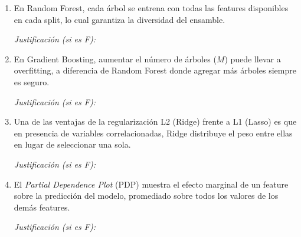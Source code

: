 \documentclass[11pt,a4paper]{article}
\begin{document}
\begin{enumerate}[label=\textbf{\arabic*.}, leftmargin=*, itemsep=18pt]

\item \underline{\hspace{1cm}} En Random Forest, cada \'arbol se entrena con todas las features disponibles en cada split, lo cual garantiza la diversidad del ensamble.

\vspace{0.5cm}
\noindent\textit{Justificaci\'on (si es F):} \underline{\hspace{12cm}}

\vspace{0.2cm}
\underline{\hspace{14cm}}

\item \underline{\hspace{1cm}} En Gradient Boosting, aumentar el n\'umero de \'arboles ($M$) puede llevar a overfitting, a diferencia de Random Forest donde agregar m\'as \'arboles siempre es seguro.

\vspace{0.5cm}
\noindent\textit{Justificaci\'on (si es F):} \underline{\hspace{12cm}}

\vspace{0.2cm}
\underline{\hspace{14cm}}

\item \underline{\hspace{1cm}} Una de las ventajas de la regularizaci\'on L2 (Ridge) frente a L1 (Lasso) es que en presencia de variables correlacionadas, Ridge distribuye el peso entre ellas en lugar de seleccionar una sola.

\vspace{0.5cm}
\noindent\textit{Justificaci\'on (si es F):} \underline{\hspace{12cm}}

\vspace{0.2cm}
\underline{\hspace{14cm}}

\item \underline{\hspace{1cm}} El \textit{Partial Dependence Plot} (PDP) muestra el efecto marginal de un feature sobre la predicci\'on del modelo, promediado sobre todos los valores de los dem\'as features.

\vspace{0.5cm}
\noindent\textit{Justificaci\'on (si es F):} \underline{\hspace{12cm}}


\end{enumerate}
\end{document}
